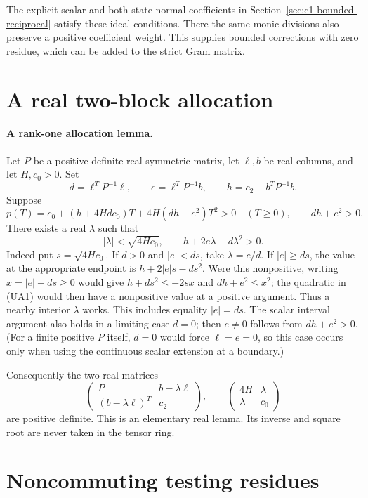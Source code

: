 The explicit scalar and both state-normal coefficients in
Section~\ref{sec:c1-bounded-reciprocal} satisfy these ideal conditions.
There the same monic divisions also preserve a positive coefficient
weight. This supplies bounded corrections with zero residue, which
can be added to the strict Gram matrix.

\section{A real two-block allocation}
\label{component:p6b22e944bd7c}
\paragraph{A rank-one allocation lemma.}
Let $P$ be a positive definite real symmetric matrix, let $\ell,b$ be
real columns, and let $H,c_0>0$. Set
\[
 d=\ell^TP^{-1}\ell,\qquad e=\ell^TP^{-1}b,\qquad
 h=c_2-b^TP^{-1}b.
\]
Suppose
\[
 p(T)=c_0+(h+4Hdc_0)T+4H(dh+e^2)T^2>0\quad(T\ge0),
 \qquad dh+e^2>0.                                      \tag{UA1}
\]
There exists a real $\lambda$ such that
\[
 |\lambda|<\sqrt{4Hc_0},\qquad
 h+2e\lambda-d\lambda^2>0.                             \tag{UA2}
\]
Indeed put $s=\sqrt{4Hc_0}$. If $d>0$ and $|e|<ds$, take
$\lambda=e/d$. If $|e|\ge ds$, the value at the appropriate endpoint
is $h+2|e|s-ds^2$. Were this nonpositive, writing
$x=|e|-ds\ge0$ would give
$h+ds^2\le-2sx$ and $dh+e^2\le x^2$; the quadratic in (UA1)
would then have a nonpositive value at a positive argument. Thus a
nearby interior $\lambda$ works. This includes equality $|e|=ds$.
The scalar interval argument also holds in a limiting case $d=0$;
then $e\ne0$ follows from $dh+e^2>0$. (For a finite positive $P$
itself, $d=0$ would force $\ell=e=0$, so this case occurs only
when using the continuous scalar extension at a boundary.)

Consequently the two real matrices
\[
 \begin{pmatrix}P&b-\lambda\ell\\(b-\lambda\ell)^T&c_2\end{pmatrix},
 \qquad
 \begin{pmatrix}4H&\lambda\\\lambda&c_0\end{pmatrix}       \tag{UA3}
\]
are positive definite. This is an elementary real lemma. Its inverse
and square root are never taken in the tensor ring.


\section{Noncommuting testing residues}


